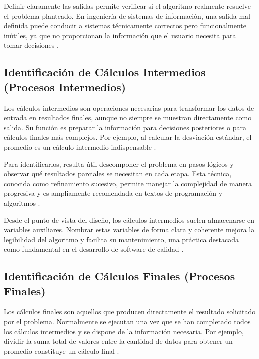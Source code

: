 \documentclass[12pt,twoside]{book}
\begin{document}
						Definir claramente las salidas permite verificar si el algoritmo realmente resuelve el problema planteado. En ingeniería de sistemas de información, una salida mal definida puede conducir a sistemas técnicamente correctos pero funcionalmente inútiles, ya que no proporcionan la información que el usuario necesita para tomar decisiones \cite{Pressman2019Software, Sommerville2015Software}.
						
					\subsection{Identificación de Cálculos Intermedios (Procesos Intermedios)}
						\noindent
						Los cálculos intermedios son operaciones necesarias para transformar los datos de entrada en resultados finales, aunque no siempre se muestran directamente como salida. Su función es preparar la información para decisiones posteriores o para cálculos finales más complejos. Por ejemplo, al calcular la desviación estándar, el promedio es un cálculo intermedio indispensable \cite{Knuth1997Art}.
						
						Para identificarlos, resulta útil descomponer el problema en pasos lógicos y observar qué resultados parciales se necesitan en cada etapa. Esta técnica, conocida como refinamiento sucesivo, permite manejar la complejidad de manera progresiva y es ampliamente recomendada en textos de programación y algoritmos \cite{Halterman2018Fundamentals}.
						
						Desde el punto de vista del diseño, los cálculos intermedios suelen almacenarse en variables auxiliares. Nombrar estas variables de forma clara y coherente mejora la legibilidad del algoritmo y facilita su mantenimiento, una práctica destacada como fundamental en el desarrollo de software de calidad \cite{McConnell2004Code}.
						
					\subsection{Identificación de Cálculos Finales (Procesos Finales)}
						\noindent
						Los cálculos finales son aquellos que producen directamente el resultado solicitado por el problema. Normalmente se ejecutan una vez que se han completado todos los cálculos intermedios y se dispone de la información necesaria. Por ejemplo, dividir la suma total de valores entre la cantidad de datos para obtener un promedio constituye un cálculo final \cite{Gaddis2022Starting}.
						
\end{document}
